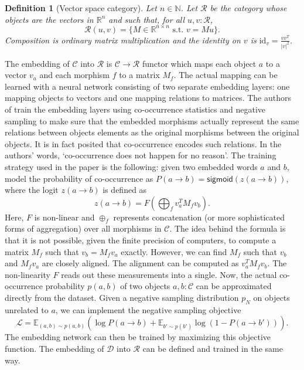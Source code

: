 \documentclass[11pt,a4paper,openright,twoside]{report}
\theoremstyle{plain}
\newtheorem{definition}[proposition]{Definition}
\theoremstyle{definition}
\begin{document}
\begin{definition}[Vector space category]
  \label{def: vecspacecat}
  Let $n \in \mathbb{N}$. Let $\mathcal{R}$ be the category whose objects are the vectors in $\mathbb{R}^n$ and such that, for all $u,v :\mathcal{R}$, 
  \[\mathcal{R}(u, v) = \{M \in \mathbb{R}^{n \times n} \text{ s.t. } v = Mu\}.\]
  Composition is ordinary matrix multiplication and the identity on $v$ is $\mathrm{id}_v = \frac{vv^T}{|v|^2}$.
\end{definition}



The embedding of $\mathcal{C}$ into $\mathcal{R}$ is   $\mathcal{C} \to \mathcal{R}$ functor which maps each object $a$ to a vector $v_a$ and each morphism $f$ to a matrix $M_f$. The actual mapping can be learned with a neural network consisting of two separate embedding layers: one mapping objects to vectors and one mapping relations to matrices. The authors of \cite{sheshmani2021categorical} train the embedding layers using co-occurrence statistics and negative sampling to make sure that the embedded morphisms actually represent the same relations between objects elements as the original morphisms between the original objects. It is in fact posited that co-occurrence encodes such relations. In the authors' words, \lq  co-occurrence does not happen for no reason\rq. The training strategy used in the paper is the following: given two embedded words $a$ and $b$, model the probability of co-occurrence as $P(a \to b) = \mathsf{sigmoid}(z(a \to b))$, where the logit $z(a \to b)$ is defined as
\[z(a \to b) = F\left(\bigoplus_f v_a^TM_fv_b \right).\]
Here, $F$ is non-linear and $\oplus_f$ represents concatenation (or more sophisticated forms of aggregation) over all morphisms in $\mathcal{C}$. The idea behind the formula is that it is not possible, given the finite precision of computers, to compute a matrix $M_f$ such that $v_b = M_fv_a$ exactly. However, we can find $M_f$ such that $v_b$ and $M_fv_a$ are closely aligned. The alignment can be computed as $v_a^TM_fv_b$. The non-linearity $F$ reads out these measurements into a single. Now, the actual co-occurrence probability $p(a,b)$ of two objects $a,b : \mathcal{C}$ can be approximated directly from the dataset. Given a negative sampling distribution $p_N$ on objects unrelated to $a$, we can implement the negative sampling objective
\[\mathcal{L} = \mathbb{E}_{(a,b) \sim p(a,b)}\left(\log P(a \to b) + \mathbb{E}_{b' \sim p(b')}\log (1-P(a \to b'))\right).\]
The embedding network can then be trained by maximizing this objective function. The embedding of $\mathcal{D}$ into $\mathcal{R}$ can be defined and trained in the same way.
\end{document}
